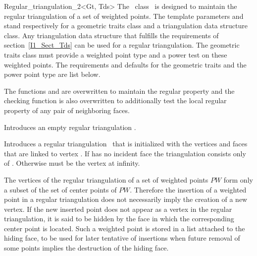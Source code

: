 \begin{ccClassTemplate}{Regular_triangulation_2<Gt, Tds>}
The \cgal\  class \ccClassTemplateName\ is designed to maintain the
regular triangulation of a set of weighted points.
The template parameters   and  stand respectively
 for a geometric traits class and a triangulation data structure class.
Any triangulation data structure that fulfills the requirements of 
section~\ref{I1_Sect_Tds} can be used for a regular triangulation.
The geometric traits class must provide a weighted point type
and a power test on these weighted points. The requirements and defaults
for the geometric traits and the power point type are list below.


 \ccInheritsFrom


The functions  and 
 are overwritten to maintain the regular
property
and the checking function  is also overwritten
to additionally test the local regular property of 
any pair of neighboring faces.

\ccTypes
\ccThreeToTwo
{}

\ccGlue
{}
\ccGlue
{}
\ccGlue
{}
\ccGlue
{}

\ccCreation
{}

{Introduces an empty regular triangulation \ccVar.}

{Introduces a regular triangulation \ccVar\ that is initialized with the
vertices and faces that are linked to vertex . If 
has no incident face the triangulation consists only of .
Otherwise  must be the vertex at infinity.}



The vertices of the regular triangulation
of a set of weighted points ${  PW}$ form only a subset
of the set of center points of ${   PW}$.
Therefore the  insertion of a weighted point  in a regular triangulation
does not necessarily imply the creation of a new vertex.
If the new inserted point does not appear as a vertex in the
regular triangulation, it is said to be hidden 
by the face in which the corresponding center point is located.
Such a weighted point is stored in a list attached to the hiding face,
to be used for later tentative of insertions when future removal
of some points implies the destruction of the hiding face.



\end{ccClassTemplate}

